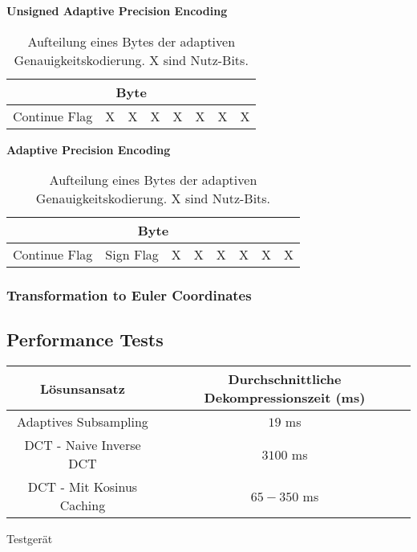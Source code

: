 \textbf{Unsigned Adaptive Precision Encoding}\\
\begin{table}[!htbp]
	\center
	\begin{tabular}{|c|c|c|c||c|c|c|c|}
	\hline
	\multicolumn{8}{|c|}{Byte}\\\hline
	Continue Flag & X & X & X & X & X & X & X \\\hline
	\end{tabular}
	\caption{Aufteilung eines Bytes der adaptiven Genauigkeitskodierung. X sind Nutz-Bits.}
	\label{anhang:format:encodings:adaptiveUnsigned}
\end{table}

\textbf{Adaptive Precision Encoding}\\
\begin{table}[!htbp]
	\center
	\begin{tabular}{|c|c|c|c||c|c|c|c|}
	\hline
	\multicolumn{8}{|c|}{Byte}\\\hline
	Continue Flag & Sign Flag & X & X & X & X & X & X \\\hline
	\end{tabular}
	\caption{Aufteilung eines Bytes der adaptiven Genauigkeitskodierung. X sind Nutz-Bits.}
	\label{anhang:format:encodings:adaptive}
\end{table}

\subsubsection{Transformation to Euler Coordinates} \label{anhang:format:euler}
\pagebreak

\subsection{Performance Tests} \label{anhang:performance}
\begin{table}[!htbp]
\center
\begin{tabular}{c|c}
	Lösunsansatz & Durchschnittliche Dekompressionszeit (ms) \\\hline
	Adaptives Subsampling & $19$ ms \\
	DCT - Naive Inverse DCT & $3100$ ms \\
	DCT - Mit Kosinus Caching & $65-350$ ms\\
\end{tabular}
\end{table}

Testgerät
